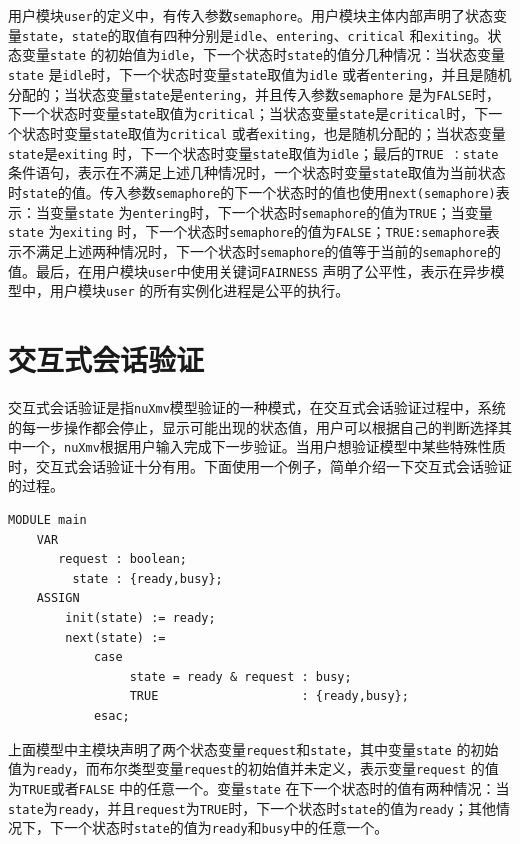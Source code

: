 用户模块\verb|user|的定义中，有传入参数\verb|semaphore|。用户模块主体内部声明了状态变量\verb|state|，\verb|state|的取值有四种分别是\verb|idle|、\verb|entering|、\verb|critical| 和\verb|exiting|。状态变量\verb|state| 的初始值为\verb|idle|，下一个状态时\verb|state|的值分几种情况：当状态变量\verb|state| 是\verb|idle|时，下一个状态时变量\verb|state|取值为\verb|idle| 或者\verb|entering|，并且是随机分配的；当状态变量\verb|state|是\verb|entering|，并且传入参数\verb|semaphore| 是为\verb|FALSE|时，下一个状态时变量\verb|state|取值为\verb|critical|；当状态变量\verb|state|是\verb|critical|时，下一个状态时变量\verb|state|取值为\verb|critical| 或者\verb|exiting|，也是随机分配的；当状态变量\verb|state|是\verb|exiting| 时，下一个状态时变量\verb|state|取值为\verb|idle|；最后的\verb|TRUE ：state| 条件语句，表示在不满足上述几种情况时，一个状态时变量\verb|state|取值为当前状态时\verb|state|的值。传入参数\verb|semaphore|的下一个状态时的值也使用\verb|next(semaphore)|表示：当变量\verb|state| 为\verb|entering|时，下一个状态时\verb|semaphore|的值为\verb|TRUE|；当变量\verb|state| 为\verb|exiting| 时，下一个状态时\verb|semaphore|的值为\verb|FALSE|；\verb|TRUE:semaphore|表示不满足上述两种情况时，下一个状态时\verb|semaphore|的值等于当前的\verb|semaphore|的值。最后，在用户模块\verb|user|中使用关键词\verb|FAIRNESS| 声明了公平性，表示在异步模型中，用户模块\verb|user| 的所有实例化进程是公平的执行。

\section{交互式会话验证}
交互式会话验证是指\verb|nuXmv|模型验证的一种模式，在交互式会话验证过程中，系统的每一步操作都会停止，显示可能出现的状态值，用户可以根据自己的判断选择其中一个，\verb|nuXmv|根据用户输入完成下一步验证。当用户想验证模型中某些特殊性质时，交互式会话验证十分有用。下面使用一个例子，简单介绍一下交互式会话验证的过程。

\begin{lstlisting}
MODULE main
    VAR
       request : boolean;
         state : {ready,busy};
    ASSIGN
    	init(state) := ready;
    	next(state) :=
            case
                 state = ready & request : busy;
                 TRUE                    : {ready,busy};
            esac;
\end{lstlisting}


上面模型中主模块声明了两个状态变量\verb|request|和\verb|state|，其中变量\verb|state| 的初始值为\verb|ready|，而布尔类型变量\verb|request|的初始值并未定义，表示变量\verb|request| 的值为\verb|TRUE|或者\verb|FALSE| 中的任意一个。变量\verb|state| 在下一个状态时的值有两种情况：当\verb|state|为\verb|ready|，并且\verb|request|为\verb|TRUE|时，下一个状态时\verb|state|的值为\verb|ready|；其他情况下，下一个状态时\verb|state|的值为\verb|ready|和\verb|busy|中的任意一个。

